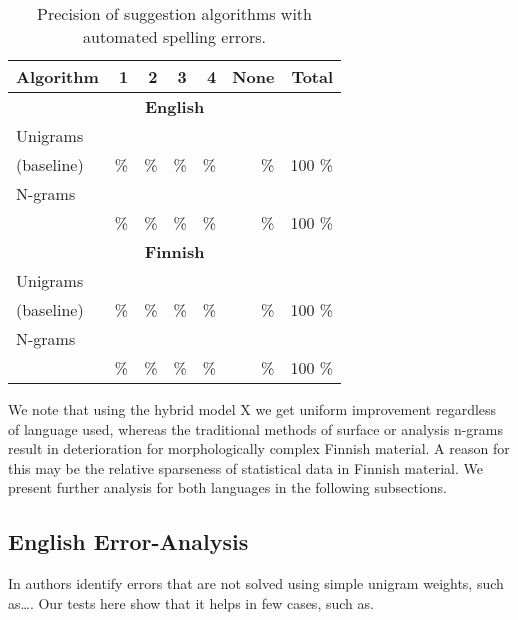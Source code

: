 \documentclass{llncs}
\begin{document}
\begin{table*}
    \caption{Precision of suggestion algorithms with automated spelling errors.
    \label{table:fake-eval}}
  \begin{center}
    \begin{scriptsize}
      \begin{tabular}{lrrrrrr}
        \hline
        Algorithm & 1 & 2 & 3 & 4 & None & Total \\
        \hline
        \multicolumn{7}{c}{\textbf{English}} \\
        \hline
        Unigrams
 &     &       &      &      &        &     \\
        (baseline)
 &  \% &    \% &   \% &   \% &    \%  & 100 \% \\
        \hline
        N-grams
&       &      &      &      &       &     \\
&    \% &   \% &   \% &   \% &    \% & 100 \% \\
        \hline
        \multicolumn{7}{c}{\textbf{Finnish}} \\
        \hline
        Unigrams
   &     &       &      &      &       &     \\
        (baseline)
 &  \% &    \% &   \% &   \% &    \% & 100 \% \\
        \hline
        N-grams 
&       &      &      &      &       &     \\
 &    \% &   \% &   \% &   \% &    \% & 100 \% \\
        \hline
      \end{tabular}
    \end{scriptsize}
  \end{center}
\end{table*}

We note that using the hybrid model X we get uniform improvement regardless
of language used, whereas the traditional methods of surface or analysis n-grams
result in deterioration for morphologically complex Finnish material. A reason
for this may be the relative sparseness of statistical data in Finnish
material. We present further analysis for both languages in the following 
subsections.

\subsection{English Error-Analysis}

In \cite{norvig/2010} authors identify errors that are not solved using simple
unigram weights, such as\ldots. Our tests here show that it helps in few
cases, such as.
\end{document}
